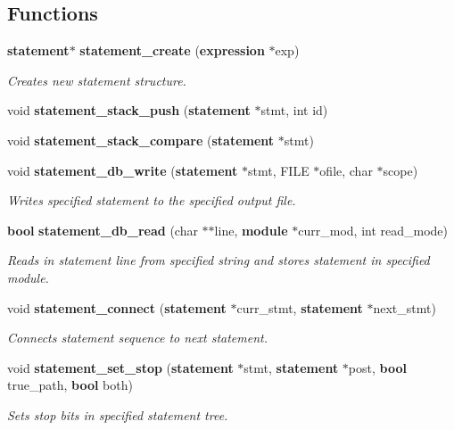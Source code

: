 \subsection*{Functions}
\begin{CompactItemize}
\item 
{\bf statement}$\ast$ {\bf statement\_\-create} ({\bf expression} $\ast$exp)
\begin{CompactList}\small\item\em Creates new statement structure.\item\end{CompactList}\item 
void {\bf statement\_\-stack\_\-push} ({\bf statement} $\ast$stmt, int id)
\item 
void {\bf statement\_\-stack\_\-compare} ({\bf statement} $\ast$stmt)
\item 
void {\bf statement\_\-db\_\-write} ({\bf statement} $\ast$stmt, FILE $\ast$ofile, char $\ast$scope)
\begin{CompactList}\small\item\em Writes specified statement to the specified output file.\item\end{CompactList}\item 
{\bf bool} {\bf statement\_\-db\_\-read} (char $\ast$$\ast$line, {\bf module} $\ast$curr\_\-mod, int read\_\-mode)
\begin{CompactList}\small\item\em Reads in statement line from specified string and stores statement in specified module.\item\end{CompactList}\item 
void {\bf statement\_\-connect} ({\bf statement} $\ast$curr\_\-stmt, {\bf statement} $\ast$next\_\-stmt)
\begin{CompactList}\small\item\em Connects statement sequence to next statement.\item\end{CompactList}\item 
void {\bf statement\_\-set\_\-stop} ({\bf statement} $\ast$stmt, {\bf statement} $\ast$post, {\bf bool} true\_\-path, {\bf bool} both)
\begin{CompactList}\small\item\em Sets stop bits in specified statement tree.\item\end{CompactList}\item 
$$
\end{CompactItemize}

